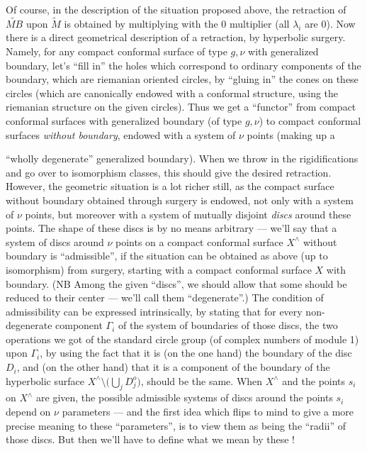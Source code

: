 \documentclass[11pt,a4paper]{article}
\begin{document}
Of course, in the description of the situation proposed above, the
retraction of $\widetilde{MB}$ upon $\widetilde{M}$ is obtained by
multiplying with the 0 multiplier (all $\lambda_{i}$ are 0). Now there is a
direct geometrical description of  a retraction, by hyperbolic
surgery. Namely, for any compact conformal surface of type $g,\nu$ with
generalized boundary, let's “fill in” the holes which correspond to ordinary
components of the boundary, which are riemanian oriented circles, by “gluing
in” the cones on these circles (which are canonically endowed with a
conformal structure, using the riemanian structure on the given circles).
Thus we get a “functor” from compact conformal surfaces with generalized
boundary (of type $g,\nu$) to compact conformal surfaces \emph{without
boundary}, endowed with a system of $\nu$ points (making up a

“wholly degenerate” generalized boundary). When we throw in the
rigidifications and go over to isomorphism classes, this should give the
desired retraction. However, the geometric situation is a lot richer still,
as the compact surface without boundary obtained through surgery is endowed,
not only with a system of $\nu$ points, but moreover with a system of
mutually disjoint \emph{discs} around these points. The shape of these discs
is by no means arbitrary — we'll say that a system of discs around $\nu$
points on a compact conformal surface $X^{\wedge}$ without boundary is
“admissible”, if the situation can be obtained as above (up to isomorphism)
from surgery, starting with a compact conformal surface $X$ with boundary.
(NB Among the given “discs”, we should allow that some should be reduced to
their center — we'll call them “degenerate”.) The condition of admissibility
can be expressed intrinsically, by stating that  for every
non-degenerate component $\Gamma_{i}$ of the system of boundaries of those
discs, the two operations we got of the standard circle group (of complex
numbers of module 1) upon $\Gamma_{i}$, by using the fact that it is (on the
one hand) the boundary of the disc $D_{i}$, and (on the other hand) that it
is a component of the boundary of the hyperbolic surface
$X^{\wedge} \setminus \bigl(\bigcup_{j} D_{j}^{o}\bigr)$, should be the same.
When $X^{\wedge}$ and the points $s_{i}$ on $X^{\wedge}$ are given, the
possible  admissible systems of discs around the points
$s_{i}$ depend on $\nu$ parameters — and the first idea which flips to mind
to give a more precise meaning to these “parameters”, is to view them as
being the “radii” of those discs. But then we'll have to define what we mean
by these !
\marginal{!}
\end{document}
